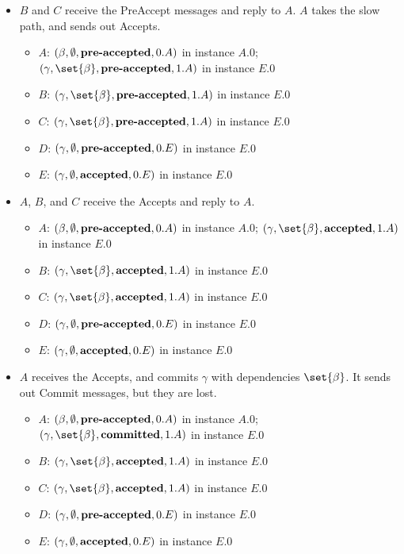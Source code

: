\documentclass{mwhittaker}
\begin{document}
\begin{itemize}
  \item
    $B$ and $C$ receive the PreAccept messages and reply to $A$. $A$ takes the
    slow path, and sends out Accepts.
    \begin{itemize}
      \item $A$: $(\beta, \emptyset{}, \textbf{pre-accepted}{}, 0.A)$ in instance $A.0$;
                 $(\gamma, \set{\beta}, \preaccepted{}, 1.A)$ in instance $E.0$
      \item $B$: $(\gamma, \set{\beta}, \preaccepted{}, 1.A)$ in instance $E.0$
      \item $C$: $(\gamma, \set{\beta}, \preaccepted{}, 1.A)$ in instance $E.0$
      \item $D$: $(\gamma, \emptyset{}, \textbf{pre-accepted}{}, 0.E)$ in instance $E.0$
      \item $E$: $(\gamma, \emptyset{}, \textbf{accepted}{}, 0.E)$ in instance $E.0$
    \end{itemize}

  \item
    $A$, $B$, and $C$ receive the Accepts and reply to $A$.
    \begin{itemize}
      \item $A$: $(\beta, \emptyset{}, \textbf{pre-accepted}{}, 0.A)$ in instance $A.0$;
                 $(\gamma, \set{\beta}, \accepted{}, 1.A)$ in instance $E.0$
      \item $B$: $(\gamma, \set{\beta}, \accepted{}, 1.A)$ in instance $E.0$
      \item $C$: $(\gamma, \set{\beta}, \accepted{}, 1.A)$ in instance $E.0$
      \item $D$: $(\gamma, \emptyset{}, \textbf{pre-accepted}{}, 0.E)$ in instance $E.0$
      \item $E$: $(\gamma, \emptyset{}, \textbf{accepted}{}, 0.E)$ in instance $E.0$
    \end{itemize}

  \item
    $A$ receives the Accepts, and commits $\gamma$ with dependencies
    $\set{\beta}$. It sends out Commit messages, but they are lost.
    \begin{itemize}
      \item $A$: $(\beta, \emptyset{}, \textbf{pre-accepted}{}, 0.A)$ in instance $A.0$;
                 $(\gamma, \set{\beta}, \committed{}, 1.A)$ in instance $E.0$
      \item $B$: $(\gamma, \set{\beta}, \accepted{}, 1.A)$ in instance $E.0$
      \item $C$: $(\gamma, \set{\beta}, \accepted{}, 1.A)$ in instance $E.0$
      \item $D$: $(\gamma, \emptyset{}, \textbf{pre-accepted}{}, 0.E)$ in instance $E.0$
      \item $E$: $(\gamma, \emptyset{}, \textbf{accepted}{}, 0.E)$ in instance $E.0$
    \end{itemize}


\end{itemize}
\end{document}
